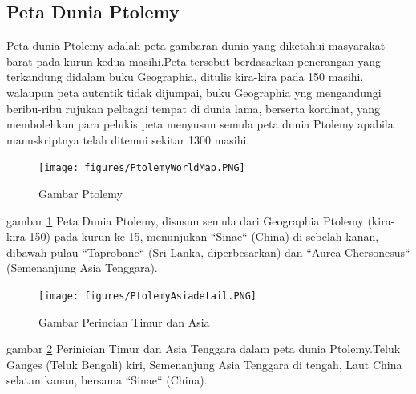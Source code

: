 \subsection{Peta Dunia Ptolemy}
		Peta dunia Ptolemy adalah peta gambaran dunia yang diketahui masyarakat barat pada kurun kedua masihi.Peta tersebut berdasarkan penerangan yang terkandung didalam buku Geographia, ditulis kira-kira pada 150 masihi. walaupun peta autentik tidak dijumpai, buku Geographia yng mengandungi beribu-ribu rujukan pelbagai tempat di dunia lama, berserta kordinat, yang membolehkan para pelukis peta menyusun semula peta dunia Ptolemy apabila manuskriptnya telah ditemui sekitar 1300 masihi.
	\begin{figure} [ht]
	\centerline{\texttt{[image: figures/PtolemyWorldMap.PNG]}}
	\caption{Gambar Ptolemy}	
	\label{PtolemyWorldMap}
	\end{figure}
	gambar \ref{PtolemyWorldMap} Peta Dunia Ptolemy, disusun semula dari Geographia Ptolemy (kira-kira 150) pada kurun ke 15, 
  menunjukan ``Sinae`` (China) di sebelah kanan, dibawah pulau ``Taprobane`` (Sri Lanka, diperbesarkan) dan ``Aurea Chersonesus`` 
  (Semenanjung Asia Tenggara).

	\begin{figure} [ht]
	\centerline{\texttt{[image: figures/PtolemyAsiadetail.PNG]}}	
	\caption{Gambar Perincian Timur dan Asia}
	\label{PtolemyAsiadetail}		
	\end{figure}
	gambar \ref{PtolemyAsiadetail} Perinician Timur dan Asia Tenggara dalam peta dunia Ptolemy.Teluk Ganges (Teluk Bengali) kiri, 
  Semenanjung Asia Tenggara di tengah, Laut China selatan kanan, bersama ``Sinae`` (China).
	

